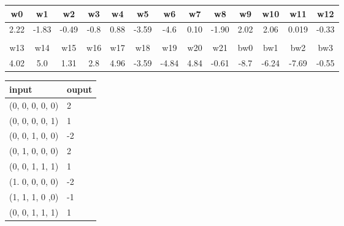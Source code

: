 \begin{tabular}{c | c | c | c | c | c | c | c | c | c | c | c | c }

w0  & w1  & w2  & w3  & w4  & w5  & w6  & w7  & w8  & w9  & w10 & w11 & w12 \\
\hline
2.22 & -1.83 & -0.49 & -0.8 & 0.88 & -3.59 & -4.6 & 0.10 & -1.90 & 2.02 & 2.06 & 0.019 & -0.33 \\ \\

w13 & w14 & w15 & w16 & w17 & w18 & w19 & w20 & w21 & bw0 & bw1 & bw2 & bw3 \\
\hline
4.02 & 5.0 & 1.31 & 2.8 & 4.96 & -3.59 & -4.84 & 4.84 & -0.61 & -8.7 & -6.24 & -7.69 & -0.55 \\

\end{tabular}



\begin{tabular}{l | l}
	input & ouput \\ \hline
	(0, 0, 0, 0, 0) & 2 \\
    (0, 0, 0, 0, 1) & 1  \\
    (0, 0, 1, 0, 0) & -2 \\
    (0, 1, 0, 0, 0) & 2 \\
    (0, 0, 1, 1, 1) & 1  \\
    (1. 0, 0, 0, 0) & -2 \\
    (1, 1, 1, 0 ,0) & -1 \\
    (0, 0, 1, 1, 1) & 1  \\
\end{tabular}


